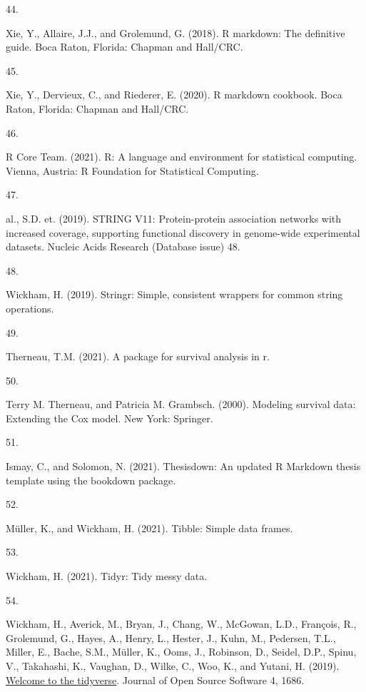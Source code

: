 \documentclass[
]{article}
\newlength{\cslhangindent}
\newlength{\csllabelwidth}
\newlength{\cslentryspacingunit} %
\newenvironment{CSLReferences}[2] %
 {%
  \setlength{\parindent}{0pt}
  \ifodd #1
  \let\oldpar\par
  \def\par{\hangindent=\cslhangindent\oldpar}
  \fi
  \setlength{\parskip}{#2\cslentryspacingunit}
 }%
 {}
\newcommand{\CSLLeftMargin}[1]{\parbox[t]{\csllabelwidth}{#1}}
\newcommand{\CSLRightInline}[1]{\parbox[t]{\linewidth - \csllabelwidth}{#1}\break}
\begin{document}
\begin{CSLReferences}{0}{0}
\leavevmode{}%
\CSLLeftMargin{44. }
\CSLRightInline{Xie, Y., Allaire, J.J., and Grolemund, G. (2018). R markdown: {The} definitive guide. {Boca Raton, Florida}: {Chapman and Hall/CRC}.}

\leavevmode{}%
\CSLLeftMargin{45. }
\CSLRightInline{Xie, Y., Dervieux, C., and Riederer, E. (2020). R markdown cookbook. {Boca Raton, Florida}: {Chapman and Hall/CRC}.}

\leavevmode{}%
\CSLLeftMargin{46. }
\CSLRightInline{R Core Team. (2021). R: {A} language and environment for statistical computing. {Vienna, Austria}: {R Foundation for Statistical Computing}.}

\leavevmode{}%
\CSLLeftMargin{47. }
\CSLRightInline{al., S.D. et. (2019). {STRING} V11: Protein-protein association networks with increased coverage, supporting functional discovery in genome-wide experimental datasets. Nucleic Acids Research (Database issue) 48.}

\leavevmode{}%
\CSLLeftMargin{48. }
\CSLRightInline{Wickham, H. (2019). Stringr: {Simple}, consistent wrappers for common string operations.}

\leavevmode{}%
\CSLLeftMargin{49. }
\CSLRightInline{Therneau, T.M. (2021). A package for survival analysis in r.}

\leavevmode{}%
\CSLLeftMargin{50. }
\CSLRightInline{Terry M. Therneau, and Patricia M. Grambsch. (2000). Modeling survival data: {Extending} the {Cox} model. {New York}: {Springer}.}

\leavevmode{}%
\CSLLeftMargin{51. }
\CSLRightInline{Ismay, C., and Solomon, N. (2021). Thesisdown: {An} updated {R Markdown} thesis template using the bookdown package.}

\leavevmode{}%
\CSLLeftMargin{52. }
\CSLRightInline{Müller, K., and Wickham, H. (2021). Tibble: {Simple} data frames.}

\leavevmode{}%
\CSLLeftMargin{53. }
\CSLRightInline{Wickham, H. (2021). Tidyr: {Tidy} messy data.}

\leavevmode{}%
\CSLLeftMargin{54. }
\CSLRightInline{Wickham, H., Averick, M., Bryan, J., Chang, W., McGowan, L.D., François, R., Grolemund, G., Hayes, A., Henry, L., Hester, J., Kuhn, M., Pedersen, T.L., Miller, E., Bache, S.M., Müller, K., Ooms, J., Robinson, D., Seidel, D.P., Spinu, V., Takahashi, K., Vaughan, D., Wilke, C., Woo, K., and Yutani, H. (2019). \href{https://doi.org/10.21105/joss.01686}{Welcome to the {tidyverse}}. Journal of Open Source Software 4, 1686.}


\end{CSLReferences}
\end{document}
